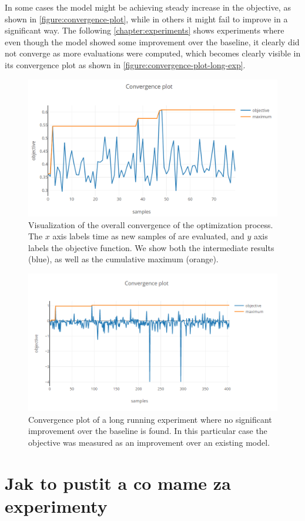 In some cases the model might be achieving steady increase in the objective, as shown in \autoref{figure:convergence-plot}, while in others it might fail to improve in a significant way. The following \autoref{chapter:experiments} shows experiments where even though the model showed some improvement over the baseline, it clearly did not converge as more evaluations were computed, which becomes clearly visible in its convergence plot as shown in \autoref{figure:convergence-plot-long-exp}.

\begin{figure}
	\begin{center}
		\includegraphics[width=1.0\textwidth]{images/convergence-plot.png}
		\caption{Visualization of the overall convergence of the optimization process. The $x$ axis labels time as new samples of are evaluated, and $y$ axis labels the objective function. We show both the intermediate results (blue), as well as the cumulative maximum (orange).}
	\end{center}
\end{figure}
\label{figure:convergence-plot}

\begin{figure}
	\begin{center}
		\includegraphics[width=1.0\textwidth]{images/convergence-plot-long-exp.png}
		\caption{Convergence plot of a long running experiment where no significant improvement over the baseline is found. In this particular case the objective was measured as an improvement over an existing model.}
	\end{center}
\end{figure}
\label{figure:convergence-plot-long-exp}


\section{Jak to pustit a co mame za experimenty}


